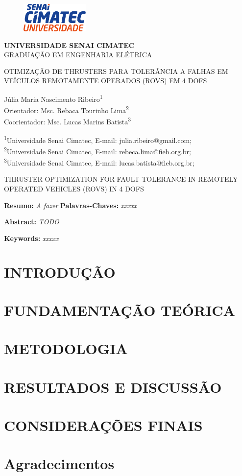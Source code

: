 \documentclass[12pt,a4paper]{article}
\makeatletter
\renewcommand\maketitle{
    \begin{figure}[ht]
        \centering
        \includegraphics[width=0.3\textwidth]{images/logotipo-SENAI-CIMATEC-Universidade-250 (1).png} 
    \end{figure}
    
    \begin{center}
        \textbf{\MakeUppercase{Universidade Senai Cimatec}}
        \\
        \MakeUppercase{Graduação em Engenharia Elétrica}
        
        \vspace{\baselineskip}
        
        \begin{large}
          \MakeUppercase{Otimização de thrusters para tolerância a falhas em veículos remotamente operados (ROVs) em 4 DOFs}
        \end{large}
    \end{center}

    \begin{flushright}
        Júlia Maria Nascimento Ribeiro\textsuperscript{1}\\
        Orientador: Msc. Rebaca Tourinho Lima\textsuperscript{2}\\
        Coorientador: Msc. Lucas Marins Batista\textsuperscript{3}\\
    \end{flushright}
    \begin{flushleft}
      \begin{small}
          \textsuperscript{1}Universidade Senai Cimatec, E-mail: julia.ribeiro@gmail.com;\\
          \textsuperscript{2}Universidade Senai Cimatec, E-mail: rebeca.lima@fieb.org.br;\\
          \textsuperscript{3}Universidade Senai Cimatec, E-mail: lucas.batista@fieb.org.br;\\
        \end{small}
      \end{flushleft}

      \begin{center}
        \begin{large}
          \MakeUppercase{Thruster Optimization for Fault Tolerance in Remotely Operated Vehicles (ROVs) in 4 DOFs}
        \end{large}
      \end{center}

    \noindent\textbf{Resumo:} 
    \textit{A fazer}
    \noindent\textbf{Palavras-Chaves:} 
      \textit{xxxxx}    

}
\newcommand\makeabstract{
  \noindent\textbf{Abstract:} 
    \textit{TODO}

  \vspace{0.4\baselineskip}

  \noindent\textbf{Keywords:} 
  \textit{xxxxx}

  \vspace{\baselineskip}
}
\makeatother
\begin{document}
    
    \maketitle
    \newpage
    \makeabstract

    \section{\MakeUppercase{Introdução}}
    \label{sec:intro}
    

    \section{\MakeUppercase{Fundamentação Teórica}}
    \label{sec:fundamentacao_teorica}
    

    \section{\MakeUppercase{Metodologia}}
    \label{sec:methodology}
    

    \section{\MakeUppercase{Resultados e Discussão}}
    \label{sec:results}
    

    \section{\MakeUppercase{Considerações finais}}
    \label{sec:conclusion}
    

    \section*{Agradecimentos}
    

\printbibliography
\end{document}
